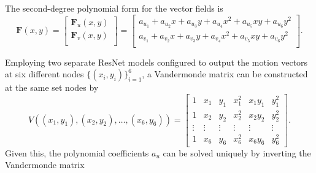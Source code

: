 The second-degree polynomial form for the vector fields is
\begin{equation*}
    \mathbf{F}(x,y) = 
    \begin{bmatrix}
        \mathbf{F}_{u}(x,y)\\
        \mathbf{F}_{v}(x,y)\\
    \end{bmatrix} =
    \begin{bmatrix}
        a_{u_1} + a_{u_2} x + a_{u_3} y + a_{u_4} x^2 + a_{u_5} xy + a_{u_6} y^2\\
        a_{v_1} + a_{v_2} x + a_{v_3} y + a_{v_4} x^2 + a_{v_5} xy + a_{v_6} y^2\\
    \end{bmatrix}.
\end{equation*}

Employing two separate ResNet models configured to output the motion vectors at six different nodes $\{ (x_i, y_i) \}_{i=1}^{6}$, a Vandermonde matrix can be constructed at the same set nodes by
\begin{equation*}
    V((x_1,y_1),(x_2,y_2),\dots,(x_{6}, y_{6})) =
    \begin{bmatrix}
        1 & x_1 & y_1 & x_{1}^2 & x_{1}y_{1} & y_{1}^2\\
        1 & x_2 & y_2 & x_{2}^2 & x_{2}y_{2} & y_{2}^2\\
        \vdots & \vdots & \vdots & \vdots & \vdots & \vdots \\
        1 & x_{6} & y_{6} & x_{6}^2 & x_{6}y_{6} & y_{6}^2
    \end{bmatrix}.
\end{equation*}
Given this, the polynomial coefficients $a_u$ can be solved uniquely by inverting the Vandermonde matrix 
